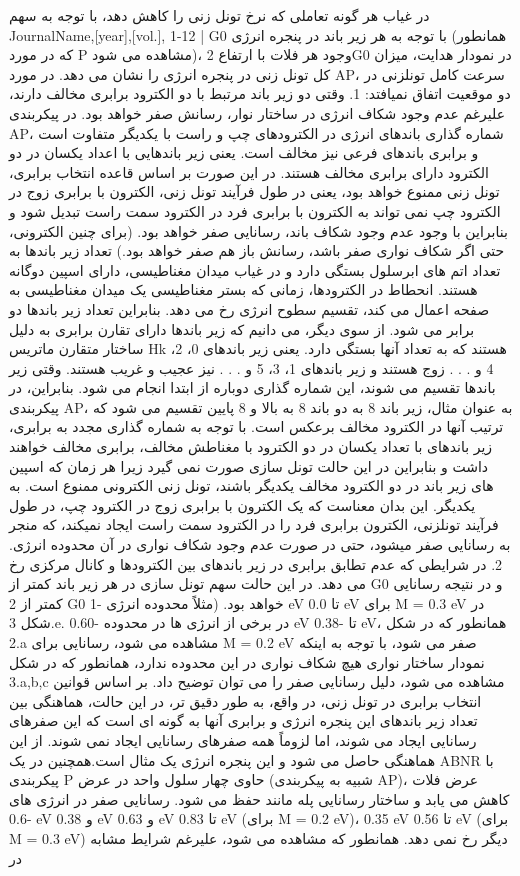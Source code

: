 در غیاب هر گونه تعاملی که نرخ تونل زنی را کاهش دهد، با توجه به سهم JournalName,[year],[vol.], 1-12 | G0 با توجه به هر زیر باند در پنجره انرژی (همانطور که در مورد P مشاهده می شود)، وجود هر فلات با ارتفاع 2G0 در نمودار هدایت، میزان کل تونل زنی در پنجره انرژی را نشان می دهد. در مورد AP، سرعت کامل تونلزنی در دو موقعیت اتفاق نمیافتد: 1. وقتی دو زیر باند مرتبط با دو الکترود برابری مخالف دارند، علیرغم عدم وجود شکاف انرژی در ساختار نوار، رسانش صفر خواهد بود. در پیکربندی AP، شماره گذاری باندهای انرژی در الکترودهای چپ و راست با یکدیگر متفاوت است و برابری باندهای فرعی نیز مخالف است. یعنی زیر باندهایی با اعداد یکسان در دو الکترود دارای برابری مخالف هستند. در این صورت بر اساس قاعده انتخاب برابری، تونل زنی ممنوع خواهد بود، یعنی در طول فرآیند تونل زنی، الکترون با برابری زوج در الکترود چپ نمی تواند به الکترون با برابری فرد در الکترود سمت راست تبدیل شود و بنابراین با وجود عدم وجود شکاف باند، رسانایی صفر خواهد بود. (برای چنین الکترونی، حتی اگر شکاف نواری صفر باشد، رسانش باز هم صفر خواهد بود.) تعداد زیر باندها به تعداد اتم های ابرسلول بستگی دارد و در غیاب میدان مغناطیسی، دارای اسپین دوگانه هستند. انحطاط در الکترودها، زمانی که بستر مغناطیسی یک میدان مغناطیسی به صفحه اعمال می کند، تقسیم سطوح انرژی رخ می دهد. بنابراین تعداد زیر باندها دو برابر می شود. از سوی دیگر، می دانیم که زیر باندها دارای تقارن برابری به دلیل ساختار متقارن ماتریس Hk هستند که به تعداد آنها بستگی دارد. یعنی زیر باندهای 0، 2، 4 و . . . زوج هستند و زیر باندهای 1، 3، 5 و . . . نیز عجیب و غریب هستند. وقتی زیر باندها تقسیم می شوند، این شماره گذاری دوباره از ابتدا انجام می شود. بنابراین، در پیکربندی AP، به عنوان مثال، زیر باند 8 به دو باند 8 به بالا و 8 پایین تقسیم می شود که ترتیب آنها در الکترود مخالف برعکس است. با توجه به شماره گذاری مجدد به برابری، زیر باندهای با تعداد یکسان در دو الکترود با مغناطش مخالف، برابری مخالف خواهند داشت و بنابراین در این حالت تونل سازی صورت نمی گیرد زیرا هر زمان که اسپین های زیر باند در دو الکترود مخالف یکدیگر باشند، تونل زنی الکترونی ممنوع است. به یکدیگر. این بدان معناست که یک الکترون با برابری زوج در الکترود چپ، در طول فرآیند تونلزنی، الکترون برابری فرد را در الکترود سمت راست ایجاد نمیکند، که منجر به رسانایی صفر میشود، حتی در صورت عدم وجود شکاف نواری در آن محدوده انرژی. 2. در شرایطی که عدم تطابق برابری در زیر باندهای بین الکترودها و کانال مرکزی رخ می دهد. در این حالت سهم تونل سازی در هر زیر باند کمتر از G0 و در نتیجه رسانایی کمتر از 2 G0 خواهد بود. (مثلاً محدوده انرژی -1 eV تا 0.0 eV برای M = 0.3 eV در شکل 3.e. در برخی از انرژی ها در محدوده -0.60 eV تا -0.38 eV، همانطور که در شکل 2.a مشاهده می شود، رسانایی برای M = 0.2 eV صفر می شود، با توجه به اینکه نمودار ساختار نواری هیچ شکاف نواری در این محدوده ندارد، همانطور که در شکل 3.a,b,c مشاهده می شود، دلیل رسانایی صفر را می توان توضیح داد. بر اساس قوانین انتخاب برابری در تونل زنی، در واقع، به طور دقیق تر، در این حالت، هماهنگی بین تعداد زیر باندهای این پنجره انرژی و برابری آنها به گونه ای است که این صفرهای رسانایی ایجاد می شوند، اما لزوماً همه صفرهای رسانایی ایجاد نمی شوند. از این هماهنگی حاصل می شود و این پنجره انرژی یک مثال است.همچنین در یک ABNR با پیکربندی P حاوی چهار سلول واحد در عرض (شبیه به پیکربندی AP)، عرض فلات کاهش می یابد و ساختار رسانایی پله مانند حفظ می شود. رسانایی صفر در انرژی های -0.6 eV و 0.38 eV و 0.63 eV تا 0.83 eV (برای M = 0.2 eV)، 0.35 eV تا 0.56 eV (برای M = 0.3 eV) دیگر رخ نمی دهد. همانطور که مشاهده می شود، علیرغم شرایط مشابه در 